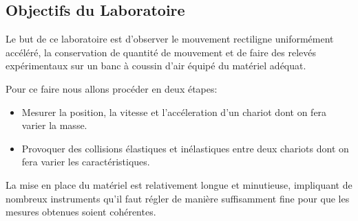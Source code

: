 \subsection*{Objectifs du Laboratoire}

Le but de ce laboratoire est d'observer le mouvement rectiligne uniformément accéléré, la conservation de quantité de mouvement et de faire des relevés expérimentaux sur un banc à coussin d'air équipé du matériel adéquat.

Pour ce faire nous allons procéder en deux étapes:

\begin{itemize}
    \item Mesurer la position, la vitesse et l'accéleration d'un chariot dont on fera varier la masse.
    \item Provoquer des collisions élastiques et inélastiques entre deux chariots dont on fera varier les caractéristiques.
\end{itemize}

La mise en place du matériel est relativement longue et minutieuse, impliquant de nombreux instruments qu'il faut régler de manière suffisamment fine pour que les mesures obtenues soient cohérentes.
